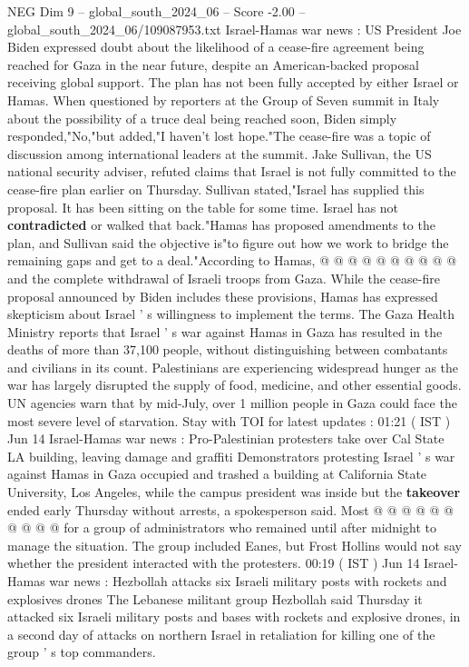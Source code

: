 \begin{textsample}{NEG Dim 9 – global\_south\_2024\_06 – Score -2.00 – global\_south\_2024\_06/109087953.txt}  \label{ex:f9_neg_397}
Israel-Hamas war news : US President Joe Biden expressed doubt about the likelihood of a cease-fire agreement being reached for Gaza in the near future, despite an American-backed proposal receiving global support.
The plan has not been fully accepted by either Israel or Hamas.
When questioned by reporters at the Group of Seven summit in Italy about the possibility of a truce deal being reached soon, Biden simply responded,"No,"but added,"I haven't lost hope."The cease-fire was a topic of discussion among international leaders at the summit.
Jake Sullivan, the US national security adviser, refuted claims that Israel is not fully committed to the cease-fire plan earlier on Thursday.
Sullivan stated,"Israel has supplied this proposal.
It has been sitting on the table for some time.
Israel has not \textbf{contradicted} or walked that back."Hamas has proposed amendments to the plan, and Sullivan said the objective is"to figure out how we work to bridge the remaining gaps and get to a deal."According to Hamas, @ @ @ @ @ @ @ @ @ @ and the complete withdrawal of Israeli troops from Gaza.
While the cease-fire proposal announced by Biden includes these provisions, Hamas has expressed skepticism about Israel ' s willingness to implement the terms.
The Gaza Health Ministry reports that Israel ' s war against Hamas in Gaza has resulted in the deaths of more than 37,100 people, without distinguishing between combatants and civilians in its count.
Palestinians are experiencing widespread hunger as the war has largely disrupted the supply of food, medicine, and other essential goods.
UN agencies warn that by mid-July, over 1 million people in Gaza could face the most severe level of starvation.
Stay with TOI for latest updates : 01:21 ( IST ) Jun 14 Israel-Hamas war news : Pro-Palestinian protesters take over Cal State LA building, leaving damage and graffiti Demonstrators protesting Israel ' s war against Hamas in Gaza occupied and trashed a building at California State University, Los Angeles, while the campus president was inside but the \textbf{takeover} ended early Thursday without arrests, a spokesperson said.
Most @ @ @ @ @ @ @ @ @ @ for a group of administrators who remained until after midnight to manage the situation.
The group included Eanes, but Frost Hollins would not say whether the president interacted with the protesters. 00:19 ( IST ) Jun 14 Israel-Hamas war news : Hezbollah attacks six Israeli military posts with rockets and explosives drones The Lebanese militant group Hezbollah said Thursday it attacked six Israeli military posts and bases with rockets and explosive drones, in a second day of attacks on northern Israel in retaliation for killing one of the group ' s top commanders.

\end{textsample}
